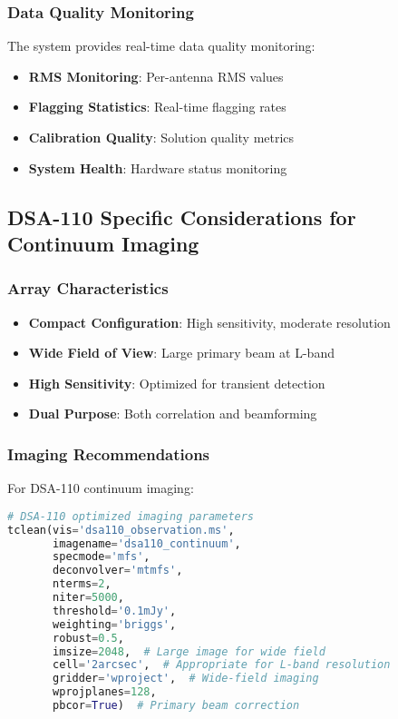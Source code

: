 \documentclass[11pt]{article}
\begin{document}
\subsubsection{Data Quality Monitoring}
The system provides real-time data quality monitoring:

\begin{itemize}
    \item \textbf{RMS Monitoring}: Per-antenna RMS values
    \item \textbf{Flagging Statistics}: Real-time flagging rates
    \item \textbf{Calibration Quality}: Solution quality metrics
    \item \textbf{System Health}: Hardware status monitoring
\end{itemize}

\subsection{DSA-110 Specific Considerations for Continuum Imaging}

\subsubsection{Array Characteristics}
\begin{itemize}
    \item \textbf{Compact Configuration}: High sensitivity, moderate resolution
    \item \textbf{Wide Field of View}: Large primary beam at L-band
    \item \textbf{High Sensitivity}: Optimized for transient detection
    \item \textbf{Dual Purpose}: Both correlation and beamforming
\end{itemize}

\subsubsection{Imaging Recommendations}
For DSA-110 continuum imaging:

\begin{lstlisting}[language=Python]
# DSA-110 optimized imaging parameters
tclean(vis='dsa110_observation.ms',
       imagename='dsa110_continuum',
       specmode='mfs',
       deconvolver='mtmfs',
       nterms=2,
       niter=5000,
       threshold='0.1mJy',
       weighting='briggs',
       robust=0.5,
       imsize=2048,  # Large image for wide field
       cell='2arcsec',  # Appropriate for L-band resolution
       gridder='wproject',  # Wide-field imaging
       wprojplanes=128,
       pbcor=True)  # Primary beam correction
\end{lstlisting}
\end{document}
